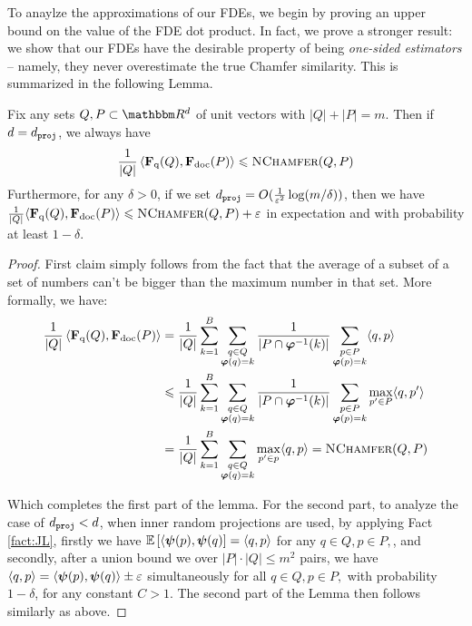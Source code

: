 To anaylze the approximations of our FDEs, we begin by proving an upper bound on the value of the FDE dot product. In fact, we prove a stronger result: we show that our FDEs have the desirable property of being \emph{one-sided estimators} -- namely, they never overestimate the true Chamfer similarity. This is summarized in the following Lemma.
\begin{lemma}\label{lem:oneside}
Fix any sets $Q,P \subset \R^d$ of unit vectors with $|Q| + |P| = m$. Then if $d=d_{\texttt{proj}}$, we always have %
 \[\frac{1}{|Q|} \left\langle  \mathbf{F}_{\text{q}}(Q) , \mathbf{F}_{\text{doc}}(P) \right\rangle \leqslant  \textsc{NChamfer}(Q,P) \]
 Furthermore, for any $\delta >0$, if we set $d_{\texttt{proj}} = O(\frac{1}{\varepsilon^2} \log (m/\delta))$, then we have  $\frac{1}{|Q|} \langle \mathbf{F}_{\text{q}}(Q) , \mathbf{F}_{\text{doc}}(P) \rangle \leqslant  \textsc{NChamfer}(Q,P) + \varepsilon$ in expectation and with probability at least $1-\delta$. 
\end{lemma}
\begin{proof}

First claim simply follows from the fact that the average of a subset of a set of numbers can't be bigger than the maximum number in that set. More formally, we have: 
\begin{equation}
    \begin{split}
    \frac{1}{|Q|}  \left\langle \mathbf{F}_{\text{q}}(Q) , \mathbf{F}_{\text{doc}}(P) \right\rangle  
     & = \frac{1}{|Q|}\sum_{k=1}^{B} \sum_{\substack{q \in Q\\ \boldsymbol{\varphi}(q) = k}}  \frac{1}{|P \cap \boldsymbol{\varphi}^{-1}(k)|} \sum_{\substack{p \in P \\ \boldsymbol{\varphi}(p)=k}} \langle q,p\rangle \\
     &\leqslant \frac{1}{|Q|}\sum_{k=1}^{B} \sum_{\substack{q \in Q \\ \boldsymbol{\varphi}(q) = k}}  \frac{1}{|P \cap \boldsymbol{\varphi}^{-1}(k)|} \sum_{\substack{p \in P \\ \boldsymbol{\varphi}(p)=k}}  \max_{p' \in P} \langle q , p'\rangle \\
       &= \frac{1}{|Q|}\sum_{k=1}^{B} \sum_{\substack{q \in Q \\ \boldsymbol{\varphi}(q) = k}} \max_{p' \in p}  \langle q,p\rangle  = \textsc{NChamfer}(Q,P) \\
    \end{split}
\end{equation}
  
    Which completes the first part of the lemma. For the second part, to analyze the case of $d_{\texttt{proj}}<d$, when inner random projections are used, by applying Fact \ref{fact:JL},  firstly we have $\mathop{ \mathbb{E}\left[ \langle \boldsymbol{\psi}(p), \boldsymbol{\psi}(q)  \right]} = \langle q, p  \rangle$ for any $q \in Q, p \in P,$, and secondly, after a union bound we over $|P|\cdot|Q| \leq m^2$ pairs, we have $\langle q, p  \rangle =  \langle \boldsymbol{\psi}(p), \boldsymbol{\psi}(q) \rangle \pm \varepsilon$ simultaneously for all $q \in Q, p \in P,$ with probability $1-\delta$, for any constant $C>1$.  The second part of the Lemma then follows similarly as above. 
\end{proof}


